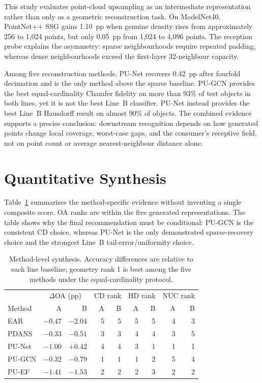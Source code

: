 This study evaluates point-cloud upsampling as an intermediate representation rather than only as a geometric reconstruction task. On ModelNet40, PointNet++ SSG gains 1.10~pp when genuine density rises from approximately 256 to 1,024 points, but only 0.05~pp from 1,024 to 4,096 points. The reception probe explains the asymmetry: sparse neighbourhoods require repeated padding, whereas dense neighbourhoods exceed the first-layer 32-neighbour capacity.

Among five reconstruction methods, PU-Net recovers 0.42~pp after fourfold decimation and is the only method above the sparse baseline. PU-GCN provides the best equal-cardinality Chamfer fidelity on more than 93\% of test objects in both lines, yet it is not the best Line~B classifier. PU-Net instead provides the best Line~B Hausdorff result on almost 90\% of objects. The combined evidence supports a precise conclusion: downstream recognition depends on how generated points change local coverage, worst-case gaps, and the consumer's receptive field, not on point count or average nearest-neighbour distance alone.

\section{Quantitative Synthesis}

Table~\ref{tab:method-synthesis} summarises the method-specific evidence without inventing a single composite score. OA ranks are within the five generated representations. The table shows why the final recommendation must be conditional: PU-GCN is the consistent CD choice, whereas PU-Net is the only demonstrated sparse-recovery choice and the strongest Line~B tail-error/uniformity choice.

\begin{table}[htbp]
\centering
\small
\begin{tabular}{lrrrrrrrr}
\toprule
& \multicolumn{2}{c}{$\Delta$OA (pp)} & \multicolumn{2}{c}{CD rank} & \multicolumn{2}{c}{HD rank} & \multicolumn{2}{c}{NUC rank} \\
Method & A & B & A & B & A & B & A & B \\
\midrule
EAR & $-0.47$ & $-2.04$ & 5 & 5 & 5 & 5 & 4 & 3 \\
PDANS & $-0.33$ & $-0.51$ & 3 & 3 & 4 & 4 & 3 & 5 \\
PU-Net & $-1.00$ & $+0.42$ & 4 & 4 & 3 & 1 & 1 & 1 \\
PU-GCN & $-0.32$ & $-0.79$ & 1 & 1 & 1 & 2 & 5 & 4 \\
PU-EF & $-1.41$ & $-1.53$ & 2 & 2 & 2 & 3 & 2 & 2 \\
\bottomrule
\end{tabular}
\caption{Method-level synthesis. Accuracy differences are relative to each line baseline; geometry rank 1 is best among the five methods under the equal-cardinality protocol.}
\label{tab:method-synthesis}
\end{table}

